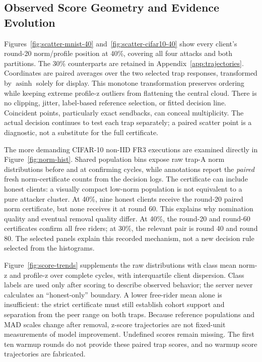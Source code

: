 \documentclass[conference]{IEEEtran}
\begin{document}
\subsection{Observed Score Geometry and Evidence Evolution}
Figures~\ref{fig:scatter-mnist-40} and~\ref{fig:scatter-cifar10-40} show every
client's round-20 norm/profile position at 40\%, covering all four attacks and
both partitions. The 30\% counterparts are retained in
Appendix~\ref{app:trajectories}. Coordinates are paired averages over the two
selected trap responses, transformed by $\operatorname{asinh}$ solely for display.
This monotone transformation preserves ordering while keeping extreme profile-z
outliers from flattening the central cloud. There is no clipping, jitter,
label-based reference selection, or fitted decision line. Coincident points,
particularly exact sendbacks, can conceal multiplicity. The actual decision
continues to test each trap separately; a paired scatter point is a diagnostic,
not a substitute for the full certificate.



The more demanding CIFAR-10 non-IID FR3 executions are examined directly in
Figure~\ref{fig:norm-hist}. Shared population bins expose raw trap-A norm
distributions before and at confirming cycles, while annotations report the
\emph{paired} fresh norm-certificate counts from the decision logs. The
certificate can include honest clients: a visually compact low-norm population
is not equivalent to a pure attacker cluster. At 40\%, nine honest clients
receive the round-20 paired norm certificate, but none receives it at round 60.
This explains why nomination quality and eventual removal quality differ.
At 40\%, the round-20 and round-60
certificates confirm all free riders; at 30\%, the relevant pair is round 40
and round 80. The selected panels explain this recorded mechanism, not a new
decision rule selected from the histograms.


Figure~\ref{fig:score-trends} supplements the raw distributions with class mean
norm-z and profile-z over complete cycles, with interquartile client dispersion.
Class labels are used only after scoring to describe observed behavior; the
server never calculates an ``honest-only'' boundary. A lower free-rider mean
alone is insufficient: the strict certificate must still establish cohort
support and separation from the peer range on both traps. Because reference
populations and MAD scales change after removal, z-score trajectories are not
fixed-unit measurements of model improvement. Undefined scores remain missing.
The first ten warmup rounds do not provide these paired trap scores, and no
warmup score trajectories are fabricated.


\end{document}
